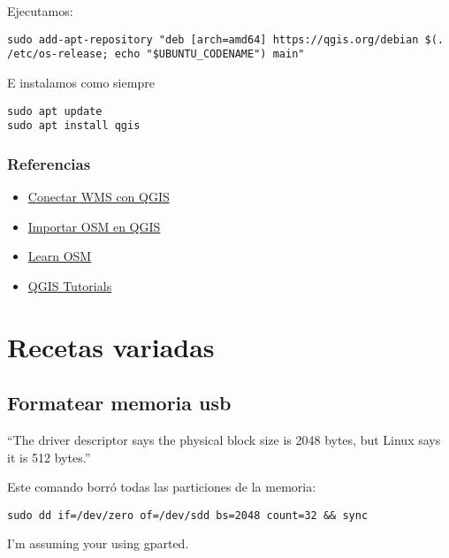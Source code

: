 \documentclass[
  12pt,
  spanish,
]{article}
\providecommand{\tightlist}{%
  \setlength{\itemsep}{0pt}\setlength{\parskip}{0pt}}
\begin{document}
Ejecutamos:

\begin{verbatim}
sudo add-apt-repository "deb [arch=amd64] https://qgis.org/debian $(. /etc/os-release; echo "$UBUNTU_CODENAME") main"
\end{verbatim}

E instalamos como siempre

\begin{verbatim}
sudo apt update
sudo apt install qgis
\end{verbatim}

\hypertarget{referencias-2}{%
\subsubsection{Referencias}\label{referencias-2}}

\begin{itemize}
\tightlist
\item
  \href{https://mappinggis.com/2015/09/como-conectar-con-servicios-wms-y-wfs-con-arcgis-qgis-y-gvsig/}{Conectar
  WMS con QGIS}
\item
  \href{https://www.altergeosistemas.com/blog/2014/03/28/importando-datos-de-osm-en-qgis-2/}{Importar
  OSM en QGIS}
\item
  \href{http://learnosm.org/es/osm-data/osm-in-qgis/}{Learn OSM}
\item
  \href{http://www.qgistutorials.com/es/docs/downloading_osm_data.html}{QGIS
  Tutorials}
\end{itemize}

\hypertarget{recetas-variadas}{%
\section{Recetas variadas}\label{recetas-variadas}}

\hypertarget{formatear-memoria-usb}{%
\subsection{Formatear memoria usb}\label{formatear-memoria-usb}}

``The driver descriptor says the physical block size is 2048 bytes, but
Linux says it is 512 bytes.''

Este comando borró todas las particiones de la memoria:

\texttt{sudo\ dd\ if=/dev/zero\ of=/dev/sdd\ bs=2048\ count=32\ \&\&\ sync}

I'm assuming your using gparted.
\end{document}
